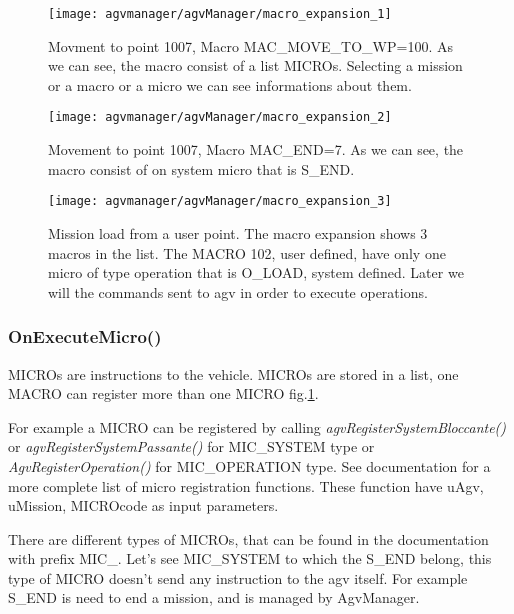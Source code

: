 \begin{figure}
	\centering\texttt{[image: agvmanager/agvManager/macro\_expansion\_1]}
	\caption{Movment to point 1007, Macro MAC\_MOVE\_TO\_WP=100. As we can see, the macro consist of a list MICROs. Selecting a mission or a macro or a micro we can see informations about them.}
	\label{fig:macro_expansion_1}
\end{figure}
\begin{figure}
	\centering\texttt{[image: agvmanager/agvManager/macro\_expansion\_2]}
	\caption{Movement to point 1007, Macro MAC\_END=7. As we can see, the macro consist of on system micro that is S\_END.}
	\label{fig:macro_expansion_2}
\end{figure}
\begin{figure}
	\centering\texttt{[image: agvmanager/agvManager/macro\_expansion\_3]}
	\caption{Mission load from a user point. The macro expansion shows 3 macros in the list. The MACRO 102, user defined, have only one micro of type operation that is O\_LOAD, system defined. Later we will the commands sent to agv in order to execute operations.}
	\label{fig:macro_expansion_3}
\end{figure}



\subsubsection{OnExecuteMicro()}

MICROs are instructions to the vehicle. MICROs are stored in a list, one MACRO can register more than one MICRO fig.\ref{fig:macro_expansion_1}.

For example a MICRO can be registered by calling \textit{agvRegisterSystemBloccante()} or  \textit{agvRegisterSystemPassante()} for MIC\_SYSTEM type or \textit{AgvRegisterOperation()} for MIC\_OPERATION type. See documentation for a more complete list of micro registration functions.
These function have uAgv, uMission, MICROcode as input parameters.

There are different types of MICROs, that can be found in the documentation with prefix MIC\_. Let's see MIC\_SYSTEM to which the S\_END belong, this type of MICRO doesn't send any instruction to the agv itself. For example S\_END is need to end a mission, and is managed by AgvManager.\\

